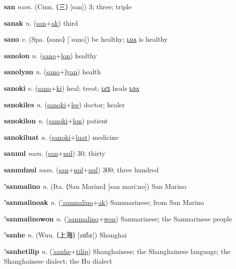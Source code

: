 \textbf{\hypertarget{san}{san}} \textit{num.} (Cmn. ⟨{\chinese{}三}⟩ [san])
3; three; triple

\textbf{\hypertarget{sanak}{sanak}} \textit{n.} (\hyperlink{san}{san}+\allowbreak \hyperlink{ak}{ak})
third

\textbf{\hypertarget{sano}{sano}} \textit{v.} (Spa. ⟨sano⟩ [ˈsano])
be healthy; \hyperlink{sanolon}{ʟᴏᴧ} is healthy

\textbf{\hypertarget{sanolon}{sanolon}} \textit{n.} (\hyperlink{sano}{sano}+\allowbreak \hyperlink{lon}{lon})
healthy

\textbf{\hypertarget{sanolyan}{sanolyan}} \textit{n.} (\hyperlink{sano}{sano}+\allowbreak \hyperlink{lyan}{lyan})
health

\textbf{\hypertarget{sanoki}{sanoki}} \textit{v.} (\hyperlink{sano}{sano}+\allowbreak \hyperlink{ki}{ki})
heal; treat; \hyperlink{sanokiles}{ʟєꜱ} heals \hyperlink{sanokilon}{ʟᴏᴧ}

\textbf{\hypertarget{sanokiles}{sanokiles}} \textit{n.} (\hyperlink{sanoki}{sanoki}+\allowbreak \hyperlink{les}{les})
doctor; healer

\textbf{\hypertarget{sanokilon}{sanokilon}} \textit{n.} (\hyperlink{sanoki}{sanoki}+\allowbreak \hyperlink{lon}{lon})
patient

\textbf{\hypertarget{sanokiluat}{sanokiluat}} \textit{n.} (\hyperlink{sanoki}{sanoki}+\allowbreak \hyperlink{luat}{luat})
medicine

\textbf{\hypertarget{sannul}{sannul}} \textit{num.} (\hyperlink{san}{san}+\allowbreak \hyperlink{nul}{nul})
30; thirty

\textbf{\hypertarget{sannulnul}{sannulnul}} \textit{num.} (\hyperlink{san}{san}+\allowbreak \hyperlink{nul}{nul}+\allowbreak \hyperlink{nul}{nul})
300; three hundred

\textbf{\hypertarget{'sanmalino}{'sanmalino}} \textit{n.} (Ita. ⟨San Marino⟩ [san mariːno])
San Marino

\textbf{\hypertarget{'sanmalinoak}{'sanmalinoak}} \textit{n.} (\hyperlink{'sanmalino}{'sanmalino}+\allowbreak \hyperlink{ak}{ak})
Sammarinese; from San Marino

\textbf{\hypertarget{'sanmalinowon}{'sanmalinowon}} \textit{n.} (\hyperlink{'sanmalino}{'sanmalino}+\allowbreak \hyperlink{won}{won})
Sanmarinese; the Sanmarinese people

\textbf{\hypertarget{'sanhe}{'sanhe}} \textit{n.} (Wuu. ⟨{\chinese{}上海}⟩ [zɑ̃hɛ])
Shanghai

\textbf{\hypertarget{'sanhetilip}{'sanhetilip}} \textit{n.} (\hyperlink{'sanhe}{'sanhe}+\allowbreak \hyperlink{tilip}{tilip})
Shanghainese; the Shanghainese language; the Shanghainese dialect; the Hu dialect

